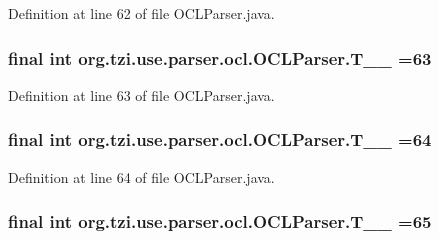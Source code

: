 Definition at line 62 of file O\-C\-L\-Parser.\-java.

\hypertarget{classorg_1_1tzi_1_1use_1_1parser_1_1ocl_1_1_o_c_l_parser_a1dcc2fbbd5822638be3ff0edac7bd447}{
\subsubsection[{T\-\_\-\-\_\-63}]{\setlength{\rightskip}{0pt plus 5cm}final int org.\-tzi.\-use.\-parser.\-ocl.\-O\-C\-L\-Parser.\-T\-\_\-\-\_ =63\hspace{0.3cm}{\ttfamily [static]}}}\label{classorg_1_1tzi_1_1use_1_1parser_1_1ocl_1_1_o_c_l_parser_a1dcc2fbbd5822638be3ff0edac7bd447}


Definition at line 63 of file O\-C\-L\-Parser.\-java.

\hypertarget{classorg_1_1tzi_1_1use_1_1parser_1_1ocl_1_1_o_c_l_parser_ae73d30fb15ced0671dffb74c0a035c25}{
\subsubsection[{T\-\_\-\-\_\-64}]{\setlength{\rightskip}{0pt plus 5cm}final int org.\-tzi.\-use.\-parser.\-ocl.\-O\-C\-L\-Parser.\-T\-\_\-\-\_ =64\hspace{0.3cm}{\ttfamily [static]}}}\label{classorg_1_1tzi_1_1use_1_1parser_1_1ocl_1_1_o_c_l_parser_ae73d30fb15ced0671dffb74c0a035c25}


Definition at line 64 of file O\-C\-L\-Parser.\-java.

\hypertarget{classorg_1_1tzi_1_1use_1_1parser_1_1ocl_1_1_o_c_l_parser_a580df6588a599687a64b96239c587549}{
\subsubsection[{T\-\_\-\-\_\-65}]{\setlength{\rightskip}{0pt plus 5cm}final int org.\-tzi.\-use.\-parser.\-ocl.\-O\-C\-L\-Parser.\-T\-\_\-\-\_ =65\hspace{0.3cm}{\ttfamily [static]}}}\label{classorg_1_1tzi_1_1use_1_1parser_1_1ocl_1_1_o_c_l_parser_a580df6588a599687a64b96239c587549}


